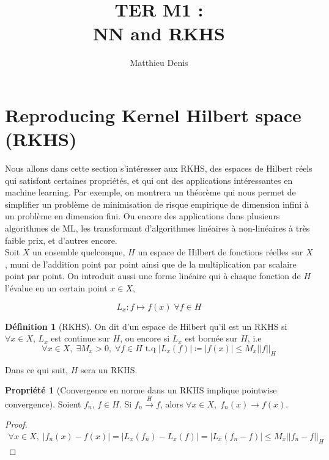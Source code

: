 \documentclass[a4paper, 11pt, french]{article}
\title{TER M1 : \\ NN and RKHS}
\author{Matthieu Denis}
\theoremstyle{definition}
\newtheorem{definition}{Définition}
\newtheorem{property}{Propriété}
\begin{document}
	
	\maketitle
	\newpage
	
	\tableofcontents
	\newpage
	
	\section{Reproducing Kernel Hilbert space (RKHS)}
	
	Nous allons dans cette section s'intéresser aux RKHS, des espaces de Hilbert réels qui satisfont certaines propriétés, et qui ont des applications intéressantes en machine learning. Par exemple, on montrera un théorème qui nous permet de simplifier un problème de minimisation de risque empirique de dimension infini à un problème en dimension fini. Ou encore des applications dans plusieurs algorithmes de ML, les transformant d'algorithmes linéaires à non-linéaires à très faible prix, et d'autres encore. \\
	
	Soit $X$ un ensemble quelconque, $H$ un espace de Hilbert de fonctions réelles sur $X$, muni de l'addition point par point ainsi que de la multiplication par scalaire point par point. On introduit aussi une forme linéaire qui à chaque fonction de $H$ l'évalue en un certain point $x \in X$,
	
	\[L_x : f \mapsto f(x) \; \forall f \in H\]
		
	\begin{definition}[RKHS]
		On dit d'un espace de Hilbert qu'il est un RKHS si $\forall x \in X$, $L_x$ est continue sur $H$, ou encore si $L_x$ est bornée sur $H$, i.e
		\[\forall x \in X, \;  \exists M_x > 0, \; \forall f \in H \text{ t.q } |L_x(f)| \coloneqq |f(x)| \leq M_x ||f||_H\]
	\end{definition}

	Dans ce qui suit, $H$ sera un RKHS.

	\begin{property}[Convergence en norme dans un RKHS implique pointwise convergence]
		Soient $f_n, \, f \in H$. Si $f_n \stackrel{H}{\to} f$, alors $\forall x \in X, \; f_n(x) \to f(x)$.
	\end{property}
	\begin{proof}
		\begin{align*}
			\forall x \in X, \; |f_n(x) - f(x)| = |L_x(f_n) - L_x(f)| = |L_x(f_n - f)| \leq M_x||f_n - f||_H
		\end{align*}
	\end{proof}
\end{document}
